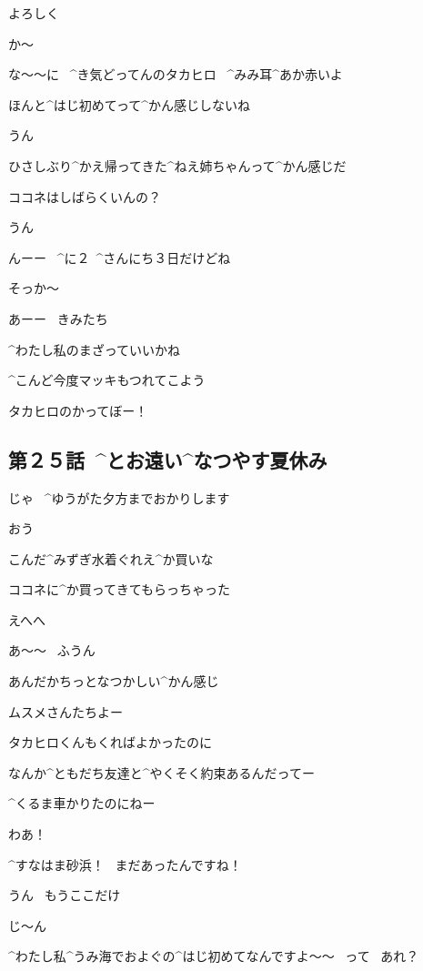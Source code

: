 \Takahiro よろしく

\Alpha か〜

\Alpha な〜〜に
\ ^{き}{気}どってんのタカヒロ
\ ^{みみ}{耳}^{あか}{赤}いよ

\page[17]
\Kokone ほんと^{はじ}{初}めてって^{かん}{感}じしないね

\Takahiro うん

\Takahiro ひさしぶり^{かえ}{帰}ってきた^{ねえ}{姉}ちゃんって^{かん}{感}じだ

\Takahiro ココネはしばらくいんの？

\Kokone うん

\Kokone んーー
\ ^{に}{２}\ ^{さんにち}{３日}だけどね

\Takahiro そっか〜

\Alpha あーー
\ きみたち

\Alpha ^{わたし}{私}のまざっていいかね

\page[18]
\Takahiro ^{こんど}{今度}マッキもつれてこよう

\Makki タカヒロのかってぼー！


\subsection{第２５話\ ^{とお}{遠}い^{なつやす}{夏休}み}

\page[20]
\Alpha じゃ
\ ^{ゆうがた}{夕方}までおかりします

\Ojisan おう

\page[21]
\Ojisan こんだ^{みずぎ}{水着}ぐれえ^{か}{買}いな

\Alpha ココネに^{か}{買}ってきてもらっちゃった

\Alpha えへへ

\Ojisan あ〜〜
\ ふうん

\Ojisan あんだかちっとなつかしい^{かん}{感}じ

\Ojisan ムスメさんたちよー

\page[22]
\Kokone タカヒロくんもくればよかったのに

\Alpha なんか^{ともだち}{友達}と^{やくそく}{約束}あるんだってー

\Alpha ^{くるま}{車}かりたのにねー

\page[23]
\Kokone わあ！

\Kokone ^{すなはま}{砂浜}！
\ まだあったんですね！

\Alpha うん
\ もうここだけ

\page[24]
\Kokone じ〜ん

\Kokone ^{わたし}{私}^{うみ}{海}でおよぐの^{はじ}{初}めてなんですよ〜〜
\ って
\ あれ？

